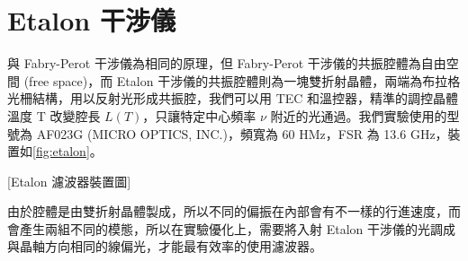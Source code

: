 \documentclass[class=NCU_thesis, crop=false]{standalone}
\begin{document}
\section{Etalon 干涉儀}
與 Fabry-Perot 干涉儀為相同的原理，但 Fabry-Perot 干涉儀的共振腔體為自由空間 (free space)，而 Etalon 干涉儀的共振腔體則為一塊雙折射晶體，兩端為布拉格光柵結構，用以反射光形成共振腔，我們可以用 TEC 和溫控器，精準的調控晶體溫度 T 改變腔長 $L(T)$，只讓特定中心頻率 $\nu$ 附近的光通過。我們實驗使用的型號為 AF023G (MICRO OPTICS, INC.)，頻寬為 60 HMz，FSR 為 13.6 GHz，裝置如\cref{fig:etalon}。

[Etalon 濾波器裝置圖]

由於腔體是由雙折射晶體製成，所以不同的偏振在內部會有不一樣的行進速度，而會產生兩組不同的模態，所以在實驗優化上，需要將入射 Etalon 干涉儀的光調成與晶軸方向相同的線偏光，才能最有效率的使用濾波器。
\end{document}
